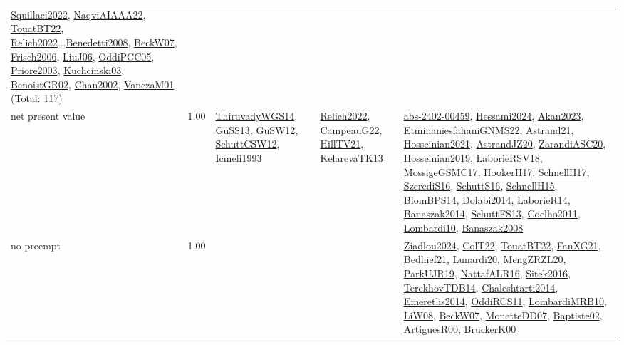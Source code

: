 {\begin{longtable}{p{3cm}r>{\raggedright\arraybackslash}p{6cm}>{\raggedright\arraybackslash}p{6cm}>{\raggedright\arraybackslash}p{8cm}}
\hyperref[detail:Squillaci2022]{Squillaci2022}, \hyperref[detail:NaqviAIAAA22]{NaqviAIAAA22}, \hyperref[detail:TouatBT22]{TouatBT22}, \hyperref[detail:Relich2022]{Relich2022}...\hyperref[detail:Benedetti2008]{Benedetti2008}, \hyperref[detail:BeckW07]{BeckW07}, \hyperref[detail:Frisch2006]{Frisch2006}, \hyperref[detail:LiuJ06]{LiuJ06}, \hyperref[detail:OddiPCC05]{OddiPCC05}, \hyperref[detail:Priore2003]{Priore2003}, \hyperref[detail:Kuchcinski03]{Kuchcinski03}, \hyperref[detail:BenoistGR02]{BenoistGR02}, \hyperref[detail:Chan2002]{Chan2002}, \hyperref[detail:VanczaM01]{VanczaM01} (Total: 117)\\
\index{net present value}\index{Concepts!net present value}net present value &  1.00 & \hyperref[detail:ThiruvadyWGS14]{ThiruvadyWGS14}, \hyperref[detail:GuSS13]{GuSS13}, \hyperref[detail:GuSW12]{GuSW12}, \hyperref[detail:SchuttCSW12]{SchuttCSW12}, \hyperref[detail:Icmeli1993]{Icmeli1993} & \hyperref[detail:Relich2022]{Relich2022}, \hyperref[detail:CampeauG22]{CampeauG22}, \hyperref[detail:HillTV21]{HillTV21}, \hyperref[detail:KelarevaTK13]{KelarevaTK13} & \hyperref[detail:abs-2402-00459]{abs-2402-00459}, \hyperref[detail:Hessami2024]{Hessami2024}, \hyperref[detail:Akan2023]{Akan2023}, \hyperref[detail:EtminaniesfahaniGNMS22]{EtminaniesfahaniGNMS22}, \hyperref[detail:Astrand21]{Astrand21}, \hyperref[detail:Hosseinian2021]{Hosseinian2021}, \hyperref[detail:AstrandJZ20]{AstrandJZ20}, \hyperref[detail:ZarandiASC20]{ZarandiASC20}, \hyperref[detail:Hosseinian2019]{Hosseinian2019}, \hyperref[detail:LaborieRSV18]{LaborieRSV18}, \hyperref[detail:MossigeGSMC17]{MossigeGSMC17}, \hyperref[detail:HookerH17]{HookerH17}, \hyperref[detail:SchnellH17]{SchnellH17}, \hyperref[detail:SzerediS16]{SzerediS16}, \hyperref[detail:SchuttS16]{SchuttS16}, \hyperref[detail:SchnellH15]{SchnellH15}, \hyperref[detail:BlomBPS14]{BlomBPS14}, \hyperref[detail:Dolabi2014]{Dolabi2014}, \hyperref[detail:LaborieR14]{LaborieR14}, \hyperref[detail:Banaszak2014]{Banaszak2014}, \hyperref[detail:SchuttFS13]{SchuttFS13}, \hyperref[detail:Coelho2011]{Coelho2011}, \hyperref[detail:Lombardi10]{Lombardi10}, \hyperref[detail:Banaszak2008]{Banaszak2008}\\
\index{no preempt}\index{Concepts!no preempt}no preempt &  1.00 &  &  & \hyperref[detail:Ziadlou2024]{Ziadlou2024}, \hyperref[detail:ColT22]{ColT22}, \hyperref[detail:TouatBT22]{TouatBT22}, \hyperref[detail:FanXG21]{FanXG21}, \hyperref[detail:Bedhief21]{Bedhief21}, \hyperref[detail:Lunardi20]{Lunardi20}, \hyperref[detail:MengZRZL20]{MengZRZL20}, \hyperref[detail:ParkUJR19]{ParkUJR19}, \hyperref[detail:NattafALR16]{NattafALR16}, \hyperref[detail:Sitek2016]{Sitek2016}, \hyperref[detail:TerekhovTDB14]{TerekhovTDB14}, \hyperref[detail:Chaleshtarti2014]{Chaleshtarti2014}, \hyperref[detail:Emeretlis2014]{Emeretlis2014}, \hyperref[detail:OddiRCS11]{OddiRCS11}, \hyperref[detail:LombardiMRB10]{LombardiMRB10}, \hyperref[detail:LiW08]{LiW08}, \hyperref[detail:BeckW07]{BeckW07}, \hyperref[detail:MonetteDD07]{MonetteDD07}, \hyperref[detail:Baptiste02]{Baptiste02}, \hyperref[detail:ArtiguesR00]{ArtiguesR00}, \hyperref[detail:BruckerK00]{BruckerK00}\\

\end{longtable}}
